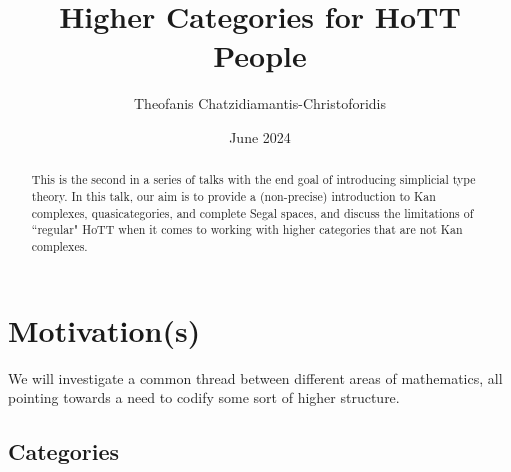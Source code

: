 \documentclass{article}
\title{Higher Categories for HoTT People}
\author{Theofanis Chatzidiamantis-Christoforidis}
\date{June 2024}
\theoremstyle{definition}
\begin{document}
\maketitle
\tableofcontents

\begin{abstract}
    This is the second in a series of talks with the end goal of introducing simplicial type theory. In this talk, our aim is to provide a (non-precise) introduction to Kan complexes, quasicategories, and complete Segal spaces, and discuss the limitations of ``regular" HoTT when it comes to working with higher categories that are not Kan complexes.
\end{abstract}

\section{Motivation(s)}

We will investigate a common thread between different areas of mathematics, all pointing towards a need to codify some sort of higher structure.

\subsection*{Categories}
\end{document}
